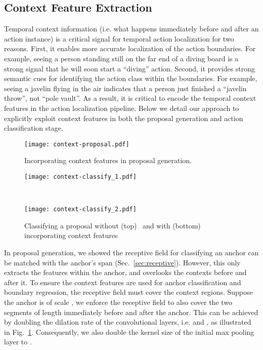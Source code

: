 \documentclass[10pt,twocolumn,letterpaper]{article}
\begin{document}
\subsection{Context Feature Extraction}
\label{sec:context}

Temporal context information (i.e. what happens immediately before and after an
action instance) is a critical signal for temporal action localization for two
reasons. First, it enables more accurate localization of the action boundaries.
For example, seeing a person standing still on the far end of a diving board is
a strong signal that he will soon start a ``diving'' action. Second, it
provides strong semantic cues for identifying the action class within the
boundaries. For example, seeing a javelin flying in the air indicates that a
person just finished a ``javelin throw'', not ``pole vault''. As a result, it
is critical to encode the temporal context features in the action localization
pipeline. Below we detail our approach to explicitly exploit context features
in both the proposal generation and action classification stage.

\begin{figure}[t]
\centering
 \texttt{[image: context-proposal.pdf]}
 \vspace{-1mm}
 \caption{\small Incorporating context features in proposal generation.}
 \vspace{-2mm}
 \label{fig:context-proposal}
\end{figure}

\begin{figure}[t]
\centering
 \begin{minipage}{0.48\textwidth}
  \centering
  \texttt{[image: context-classify\_1.pdf]}
 \end{minipage}
 \\\vspace{1mm}
 \begin{minipage}{0.48\textwidth}
  \centering
  \texttt{[image: context-classify\_2.pdf]}
 \end{minipage}
 \vspace{-1mm}
 \caption{\small Classifying a proposal without
(top)~\cite{girshick:iccv2015,ren:nips2015} and with (bottom) incorporating
context features}
 \vspace{-2mm}
 \label{fig:context-classify}
\end{figure}

In proposal generation, we showed the receptive field for classifying an anchor
can be matched with the anchor's span (Sec.~\ref{sec:receptive}). However, this
only extracts the features within the anchor, and overlooks the contexts before
and after it. To ensure the context features are used for anchor classification
and boundary regression, the receptive field must cover the context regions.
Suppose the anchor is of scale , we enforce the receptive field to also
cover the two segments of length  immediately before and after the anchor.
This can be achieved by doubling the dilation rate of the convolutional layers,
i.e.  and , as illustrated in
Fig.~\ref{fig:context-proposal}. Consequently, we also double the kernel size
of the initial max pooling layer to .
\end{document}

